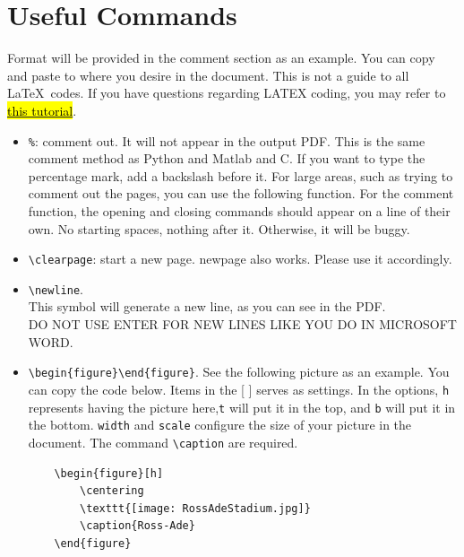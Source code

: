 \documentclass[letterpaper, 11pt]{article}
\begin{document}
\clearpage
\section*{Useful Commands}
Format will be provided in the comment section as an example. You can copy and paste to where you desire in the document. This is not a guide to all \LaTeX\ codes. If you have questions regarding LATEX coding, you may refer to \href{https://www.overleaf.com/learn/latex/Learn_LaTeX_in_30_minutes}{\hl{this tutorial}}.
\begin{itemize}
    \item \verb|%|: comment out. It will not appear in the output PDF. This is the same comment method as Python and Matlab and C. If you want to type the percentage mark, add a backslash before it. For large areas, such as trying to comment out the pages, you can use the following function. For the comment function, the opening and closing commands should appear on a line of their own. No starting spaces, nothing after it. Otherwise, it will be buggy.

    \item \verb|\clearpage|: start a new page. newpage also works. Please use it accordingly.
    \item \verb|\newline|. \\
          This symbol will generate a new line, as you can see in the PDF. \\
          DO NOT USE ENTER FOR NEW LINES LIKE YOU DO IN MICROSOFT WORD.
    \item \verb|\begin{figure}\end{figure}|. See the following picture as an example. You can copy the code below. Items in the [ ] serves as settings. In the options, \verb|h| represents having the picture here,\verb|t| will put it in the top, and \verb|b| will put it in the bottom. \verb|width| and \verb|scale| configure the size of your picture in the document. The command \verb|\caption| are required.
          \begin{verbatim}
    \begin{figure}[h]
        \centering
        \texttt{[image: RossAdeStadium.jpg]} 
        \caption{Ross-Ade}
    \end{figure}
    \end{verbatim}


\end{itemize}
\end{document}

